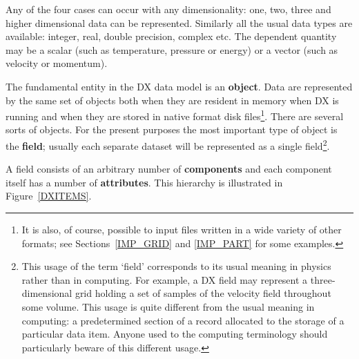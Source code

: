\documentclass[twoside,11pt]{starlink}
\begin{document}
Any of the four cases can occur with any dimensionality: one, two,
three and higher dimensional data can be represented. Similarly all
the usual data types are available: integer, real, double precision,
complex etc. The dependent quantity may be a scalar (such as temperature,
pressure or energy) or a vector (such as velocity or momentum).

The fundamental entity in the DX data model is an \textbf{object}. Data
are represented by the same set of objects both when they are resident
in memory when DX is running and when they are stored in native format
disk files\footnote{It is also, of course, possible to input files
written in a wide variety of other formats; see Sections~\ref{IMP_GRID}
and \ref{IMP_PART} for some examples.}. There are several sorts of objects.
For the present purposes the most important type of object is the \textbf{field}; usually each separate dataset will be represented as a single
field\footnote{This usage of the term `field' corresponds to its usual
meaning in physics rather than in computing. For example, a DX field may
represent a three-dimensional grid holding a set of samples of the
velocity field throughout some volume. This usage is quite different from
the usual meaning in computing: a predetermined section of a record
allocated to the storage of a particular data item. Anyone used to the
computing terminology should particularly beware of this different
usage.}.

A field consists of an arbitrary number of \textbf{components} and each
component itself has a number of \textbf{attributes}. This hierarchy is
illustrated in Figure~\ref{DXITEMS}.
\end{document}
